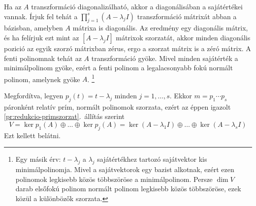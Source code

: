\documentclass[9pt, a4paper, showtrims]{memoir}
\makeatletter
\renewenvironment{proof}[1][\proofname]
    {\par\pushQED{\qed}%
    \normalfont \topsep6\p@\@plus6\p@\relax
    \trivlist
    \item[\hskip\labelsep
        \itshape
    #1\@addpunct{:}]\ignorespaces}
    {\popQED\endtrivlist\@endpefalse}
\theoremstyle{plain}
\theoremstyle{remark}
\theoremstyle{definition}
\makeatother
\begin{document}
    \begin{proof}
        Ha az $A$ transzformáció diagonalizálható,
        akkor a diagonálisában a sajátértékei vannak.
        Írjuk fel tehát a 
        \begin{math}
            \prod_{j=1}^s\left( A-\lambda_j I \right)
        \end{math}
        transzformáció mátrixát abban a bázisban, 
        amelyben $A$ mátrixa is diagonális.
        Az eredmény egy diagonális mátrix,
        és ha felírjuk ezt mint az $[A-\lambda_j I]$ mátrixok szorzatát,
        akkor minden diagonális pozició az egyik szorzó mátrixban zérus,
        ergo a szorzat mátrix is a zéró mátrix.
        A fenti polinomnak tehát az $A$ transzformáció gyöke.
        Mivel minden sajátérték a minimálpolinom gyöke, 
        ezért a fenti polinom a legalacsonyabb fokú normált polinom, 
        amelynek gyöke $A$.
        \footnote{
            Egy másik érv: $t-\lambda_j$ a $\lambda_j$ sajátértékhez tartozó sajátvektor kis minimálpolinomja. 
            Mivel a sajátvektorok egy bazist alkotnak,
            ezért ezen polinomok legkisebb közös többszöröse a minimálpolinom.
            Persze $\dim V$ darab elsőfokú polinom normált polinom legkisebb közös többszöröse,
            ezek közül a különbözők szorzata.
        }

        Megfordítva,
        legyen $p_j\left( t \right)=t-\lambda_j$ minden $j=1,\dots,s.$
        Ekkor $m=p_1\cdots p_s$ páronként relatív prím, normált polinomok szorzata,
        ezért az éppen igazolt \ref{pr:redukcio-primszorzat}.~állítás szerint 
        \begin{equation*}
            V=
            \ker p_1\left( A \right)\oplus\dots\oplus\ker p_j\left( A \right)
            =
            \ker\left( A-\lambda_1 I \right)\oplus\dots\oplus\ker\left( A-\lambda_s I \right)
        \end{equation*}
        Ezt kellett belátni. 
    \end{proof}
\end{document}
